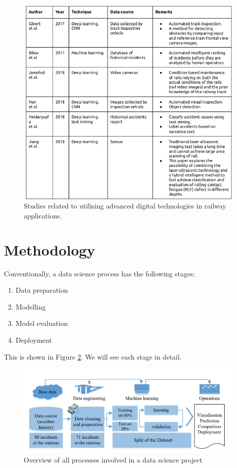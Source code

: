 \begin{figure}
    \centering
    \includegraphics[scale=.4]{chapters/images/related_works.png}
    \caption{Studies related to utilising advanced digital technologies in railway applications.}
    \label{fig:related_works}
\end{figure}

\section{Methodology}
Conventionally, a data science process has the following stages;
\begin{enumerate}
    \item Data preparation
    \item Modelling
    \item Model evaluation
    \item Deployment 
\end{enumerate}
This is shown in Figure \ref{fig:metho}. We will see each stage in detail. 

\begin{figure}
    \centering
    \includegraphics[scale=0.3]{chapters/images/methodology.png}
    \caption{Overview of all processes involved in a data science project}
    \label{fig:metho}
\end{figure}

